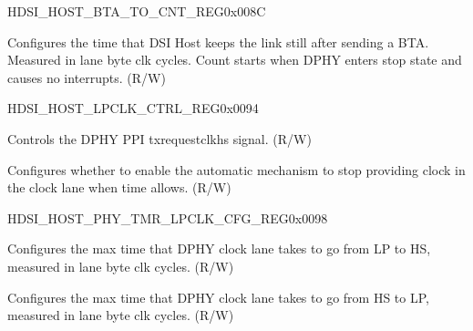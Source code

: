 \begin{register}{H}{DSI\_HOST\_BTA\_TO\_CNT\_REG}{0x008C}\label{regdesc:DSIHOSTBTATOCNTREG}
%
%
\regnewline%
\begin{regdesc}\begin{reglist}
\label{fielddesc:DSIHOSTBTATOCNT}\item [DSI\_HOST\_BTA\_TO\_CNT] Configures the time that DSI Host keeps the link still after sending a BTA. Measured in lane byte clk cycles. Count starts when DPHY enters stop state and causes no interrupts. (R/W)
\end{reglist}\end{regdesc}
\end{register}




\begin{register}{H}{DSI\_HOST\_LPCLK\_CTRL\_REG}{0x0094}\label{regdesc:DSIHOSTLPCLKCTRLREG}
%
%
%
\regnewline%
\begin{regdesc}\begin{reglist}
\label{fielddesc:DSIHOSTPHYTXREQUESTCLKHS}\item [DSI\_HOST\_PHY\_TXREQUESTCLKHS] Controls the DPHY PPI txrequestclkhs signal. (R/W)
\label{fielddesc:DSIHOSTAUTOCLKLANECTRL}\item [DSI\_HOST\_AUTO\_CLKLANE\_CTRL] Configures whether to enable the automatic mechanism to stop providing clock in the clock lane when time allows. (R/W)
\end{reglist}\end{regdesc}
\end{register}


\begin{register}{H}{DSI\_HOST\_PHY\_TMR\_LPCLK\_CFG\_REG}{0x0098}\label{regdesc:DSIHOSTPHYTMRLPCLKCFGREG}
%
%
%
%
\regnewline%
\begin{regdesc}\begin{reglist}
\label{fielddesc:DSIHOSTPHYCLKLP2HSTIME}\item [DSI\_HOST\_PHY\_CLKLP2HS\_TIME] Configures the max time that DPHY clock lane takes to go from LP to HS, measured in lane byte clk cycles. (R/W)
\label{fielddesc:DSIHOSTPHYCLKHS2LPTIME}\item [DSI\_HOST\_PHY\_CLKHS2LP\_TIME] Configures the max time that DPHY clock lane takes to go from HS to LP, measured in lane byte clk cycles. (R/W)
\end{reglist}\end{regdesc}
\end{register}


